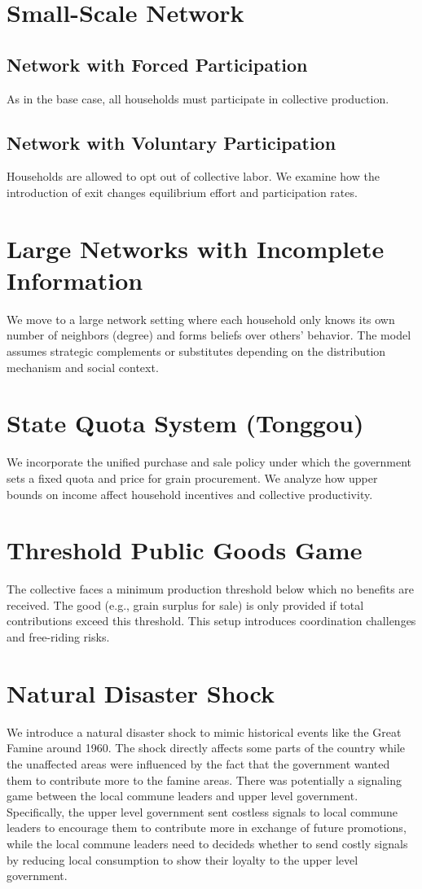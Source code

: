 \documentclass[12pt]{article}
\begin{document}
\section{Small-Scale Network}
\subsection{Network with Forced Participation}
As in the base case, all households must participate in collective production.

\subsection{Network with Voluntary Participation}
Households are allowed to opt out of collective labor. We examine how the introduction of exit changes equilibrium effort and participation rates.

\section{Large Networks with Incomplete Information}
We move to a large network setting where each household only knows its own number of neighbors (degree) and forms beliefs over others' behavior. The model assumes strategic complements or substitutes depending on the distribution mechanism and social context.

\section{State Quota System (Tonggou)}
We incorporate the unified purchase and sale policy under which the government sets a fixed quota and price for grain procurement. We analyze how upper bounds on income affect household incentives and collective productivity.

\section{Threshold Public Goods Game}
The collective faces a minimum production threshold below which no benefits are received. The good (e.g., grain surplus for sale) is only provided if total contributions exceed this threshold. This setup introduces coordination challenges and free-riding risks.

\section{Natural Disaster Shock}
We introduce a natural disaster shock to mimic historical events like the Great Famine around 1960. The shock directly affects some parts of the country while the unaffected areas were influenced by the fact that the government wanted them to contribute more to the famine areas. There was potentially a signaling game between the local commune leaders and upper level government. Specifically, the upper level government sent costless signals to local commune leaders to encourage them to contribute more in exchange of future promotions, while the local commune leaders need to decideds whether to send costly signals by reducing local consumption to show their loyalty to the upper level government.
\end{document}

